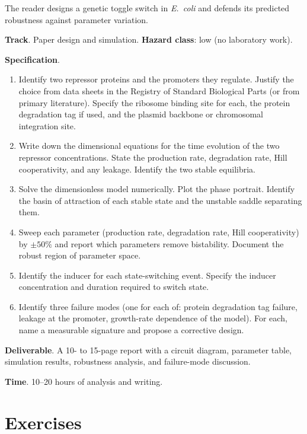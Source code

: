 \begin{project}
The reader designs a genetic toggle switch in \emph{E.\ coli} and
defends its predicted robustness against parameter variation.

\textbf{Track}. Paper design and simulation.
\textbf{Hazard class}: low (no laboratory work).

\textbf{Specification}.

\begin{enumerate}[leftmargin=*]
\item Identify two repressor proteins and the promoters they
  regulate. Justify the choice from data sheets in the Registry of
  Standard Biological Parts (or from primary literature). Specify
  the ribosome binding site for each, the protein degradation tag
  if used, and the plasmid backbone or chromosomal integration site.
\item Write down the dimensional equations for the time evolution of
  the two repressor concentrations. State the production rate,
  degradation rate, Hill cooperativity, and any leakage. Identify
  the two stable equilibria.
\item Solve the dimensionless model numerically. Plot the phase
  portrait. Identify the basin of attraction of each stable state
  and the unstable saddle separating them.
\item Sweep each parameter (production rate, degradation rate, Hill
  cooperativity) by $\pm 50\%$ and report which parameters remove
  bistability. Document the robust region of parameter space.
\item Identify the inducer for each state-switching event.
  Specify the inducer concentration and duration required to switch
  state.
\item Identify three failure modes (one for each of: protein
  degradation tag failure, leakage at the promoter, growth-rate
  dependence of the model). For each, name a measurable signature
  and propose a corrective design.
\end{enumerate}

\textbf{Deliverable}. A 10- to 15-page report with a circuit diagram,
parameter table, simulation results, robustness analysis, and
failure-mode discussion.

\textbf{Time}. 10--20 hours of analysis and writing.
\end{project}

\section{Exercises}

